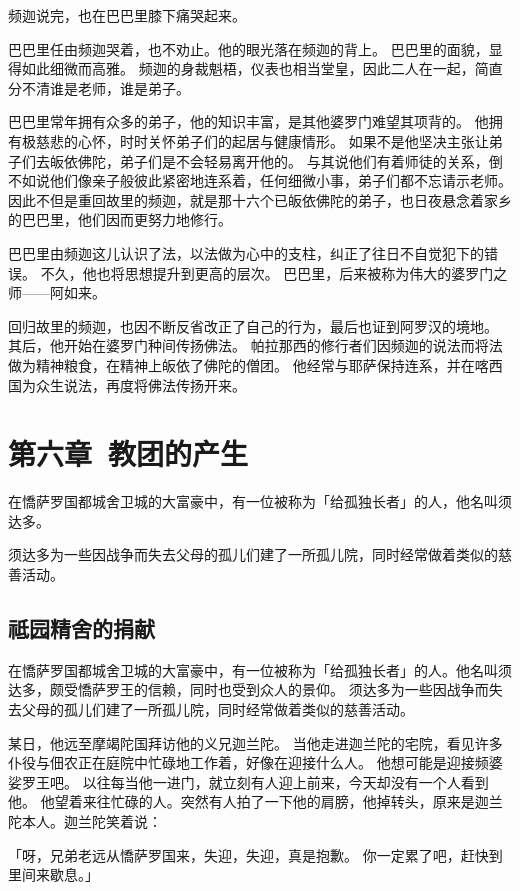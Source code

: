 \documentclass[twoside,openany]{book}
\begin{document}
频迦说完，也在巴巴里膝下痛哭起来。

巴巴里任由频迦哭着，也不劝止。他的眼光落在频迦的背上。
巴巴里的面貌，显得如此细微而高雅。
频迦的身裁魁梧，仪表也相当堂皇，因此二人在一起，简直分不清谁是老师，谁是弟子。

巴巴里常年拥有众多的弟子，他的知识丰富，是其他婆罗门难望其项背的。
他拥有极慈悲的心怀，时时关怀弟子们的起居与健康情形。
如果不是他坚决主张让弟子们去皈依佛陀，弟子们是不会轻易离开他的。
与其说他们有着师徒的关系，倒不如说他们像亲子般彼此紧密地连系着，任何细微小事，弟子们都不忘请示老师。
因此不但是重回故里的频迦，就是那十六个已皈依佛陀的弟子，也日夜悬念着家乡的巴巴里，他们因而更努力地修行。

巴巴里由频迦这儿认识了法，以法做为心中的支柱，纠正了往日不自觉犯下的错误。
不久，他也将思想提升到更高的层次。
巴巴里，后来被称为伟大的婆罗门之师——阿如来。

回归故里的频迦，也因不断反省改正了自己的行为，最后也证到阿罗汉的境地。
其后，他开始在婆罗门种间传扬佛法。
帕拉那西的修行者们因频迦的说法而将法做为精神粮食，在精神上皈依了佛陀的僧团。
他经常与耶萨保持连系，并在喀西国为众生说法，再度将佛法传扬开来。

\chapter{第六章\ 教团的产生}\label{ch6}
在憍萨罗国都城舍卫城的大富豪中，有一位被称为「给孤独长者」的人，他名叫须达多。

须达多为一些因战争而失去父母的孤儿们建了一所孤儿院，同时经常做着类似的慈善活动。
\newpage

\section{祗园精舍的捐献}\label{sec6.1}

在憍萨罗国都城舍卫城的大富豪中，有一位被称为「给孤独长者」的人。他名叫须达多，颇受憍萨罗王的信赖，同时也受到众人的景仰。
须达多为一些因战争而失去父母的孤儿们建了一所孤儿院，同时经常做着类似的慈善活动。

某日，他远至摩竭陀国拜访他的义兄迦兰陀。
当他走进迦兰陀的宅院，看见许多仆役与佃农正在庭院中忙碌地工作着，好像在迎接什么人。
他想可能是迎接频婆娑罗王吧。
以往每当他一进门，就立刻有人迎上前来，今天却没有一个人看到他。
他望着来往忙碌的人。突然有人拍了一下他的肩膀，他掉转头，原来是迦兰陀本人。迦兰陀笑着说：

「呀，兄弟老远从憍萨罗国来，失迎，失迎，真是抱歉。
你一定累了吧，赶快到里间来歇息。」
\end{document}
